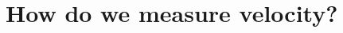 \section{How do we measure velocity?} \label{S:1.1.Velocity}



\newpage



\newpage



\newpage



\newpage
